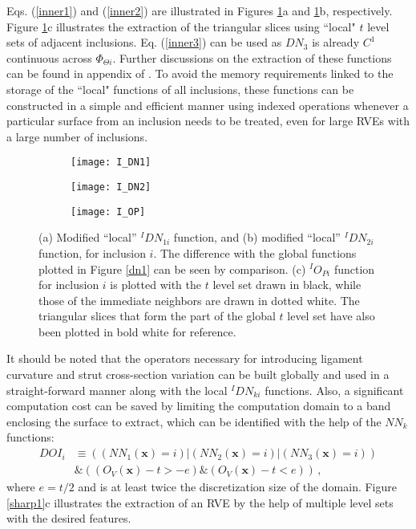 Eqs. (\ref{inner1}) and (\ref{inner2}) are illustrated in Figures \ref{inner4}a and \ref{inner4}b, respectively. Figure \ref{inner4}c illustrates the extraction of the triangular slices using ``local" $ t $ level sets of adjacent inclusions. Eq. (\ref{inner3}) can be used as $ DN_3 $ is already $ C^1 $ continuous across $ \Phi_{\Theta i} $. Further discussions on the extraction of these functions can be found in appendix of \cite{sononAdvancedApproachGeneration2015}. To avoid the memory requirements linked to the storage of the ``local" functions of all inclusions, these functions can be constructed in a simple and efficient manner using indexed operations whenever a particular surface from an inclusion needs to be treated, even for large RVEs with a large number of inclusions.

\begin{figure}
	\centering
	\begin{subfigure}[b]{0.32\textwidth}
		\texttt{[image: I\_DN1]}
		\caption{}
	\end{subfigure}
	\begin{subfigure}[b]{0.32\textwidth}
		\texttt{[image: I\_DN2]}
		\caption{}
	\end{subfigure}
	\begin{subfigure}[b]{0.32\textwidth}
		\texttt{[image: I\_OP]}
		\caption{}
	\end{subfigure}
	\caption{(a) Modified ``local'' $ ^IDN_{1i} $ function, and (b) modified ``local'' $ ^IDN_{2i} $ function, for inclusion $i$. The difference with the global functions plotted in Figure \ref{dn1} can be seen by comparison. (c) $ ^IO_{Pi} $ function for inclusion $i$ is plotted with the $ t $ level set drawn in black, while those of the immediate neighbors are drawn in dotted white. The triangular slices that form the part of the global $ t $ level set have also been plotted in bold white for reference. }\label{inner4}
\end{figure}

It should be noted that the operators necessary for introducing ligament curvature and strut cross-section variation can be built globally and used in a straight-forward manner along with the local $ ^IDN_{ki} $ functions. Also, a significant computation cost can be saved by limiting the computation domain to a band enclosing the surface to extract, which can be identified with the help of the $ NN_k $ functions:
\begin{equation}
\begin{split}
DOI_i&\equiv\left(\left(NN_1(\textbf{x})=i\right)|\left(NN_2(\textbf{x})=i\right)|\left(NN_3(\textbf{x})=i\right)\right)\\
&\&\left(\left(O_V(\textbf{x})-t>-e\right)\&\left(O_V(\textbf{x})-t<e\right)\right)\,,
\end{split}
\end{equation}
where $ e=t/2 $ and is at least twice the discretization size of the domain.
Figure \ref{sharp1}c illustrates the extraction of an RVE by the help of multiple level sets with the desired features.

